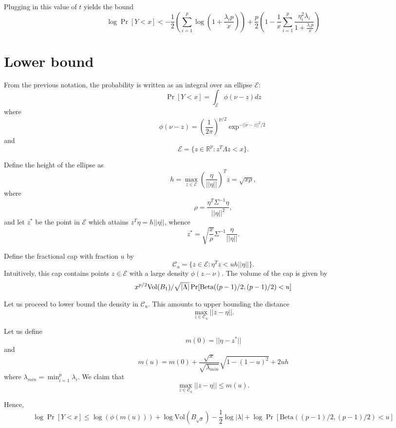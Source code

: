 \documentclass[12pt]{article}
\begin{document}
Plugging in this value of $t$ yields the bound
\[
\log \Pr[Y < x] < -\frac{1}{2}\left(\sum_{i=1}^p \log\left(1 + \frac{\lambda_i p}{x}\right)\right) + 
\frac{p}{2} \left(1 - \frac{1}{x}\sum_{i=1}^p \frac{\eta_i^2 \lambda_i}{1 + \frac{\lambda_i p}{x}}\right)
\]

\section{Lower bound}

From the previous notation, the probability is written as an integral over an ellipse $\mathcal{E}$:
\[
\Pr[Y < x] = \int_{\mathcal{E}} \phi(\nu - z) dz
\]
where
\[
\phi(\nu - z) = \left(\frac{1}{2\pi}\right)^{p/2} \exp^{-||\nu - z||^2/2}
\]
and
\[
\mathcal{E} = \{z \in \mathbb{R}^p: z^T \Lambda z < x\}.
\]

Define the height of the ellipse as
\[
h = \max_{z \in \mathcal{E}} \left(\frac{\eta}{||\eta||}\right)^T z = \sqrt{x \rho},
\]
where
\[
\rho = \frac{\eta^T \Sigma^{-1}\eta}{||\eta||^2},
\]
and let $z^*$ be the point in $\mathcal{E}$ which attains $z^T\eta = h||\eta||$,
whence
\[
z^* = \sqrt{\frac{x}{\rho}} \Sigma^{-1} \frac{\eta}{||\eta||}.
\]


Define the fractional cap with fraction $u$ by
\[
\mathcal{C}_u = \{z \in \mathcal{E}: \eta^T z < uh||\eta|| \}.
\]
Intuitively, this cap contains points $z \in \mathcal{E}$ with a large density $\phi(z - \nu)$.
The volume of the cap is given by
\[
x^{p/2}\text{Vol}(B_1)/\sqrt{|\Lambda|}\Pr[\text{Beta}((p-1)/2, (p-1)/2) < u]
\]

Let us proceed to lower bound the density in $\mathcal{C}_u$.
This amounts to upper bounding the distance
\[
\max_{z \in \mathcal{C}_u} ||z - \eta||.
\]

Let us define
\[
m(0) = ||\eta - z^*||
\]
and
\[
m(u) = m(0) + \frac{\sqrt{x}}{\sqrt{\lambda_{min}}} \sqrt{1-(1-u)^2} + 2uh
\]
where $\lambda_{min} = \min_{i=1}^p \lambda_i$.
We claim that
\[
\max_{z \in \mathcal{C}_u} ||z - \eta|| \leq m(u).
\]

Hence,
\[
\log\Pr[Y < x] \leq \log(\phi(m(u))) + \log\text{Vol}(B_{\sqrt{x}}) - \frac{1}{2}\log|\lambda|
+ \log \Pr[\text{Beta}((p-1)/2, (p-1)/2) < u]
\]
\end{document}
